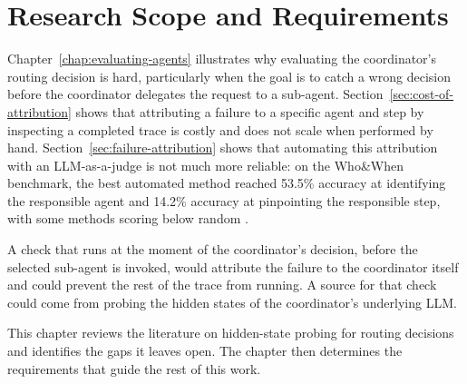 \chapter{Research Scope and Requirements}
\label{chap:motivation}

Chapter~\ref{chap:evaluating-agents} illustrates why evaluating the coordinator's routing decision is hard, particularly when the goal is to catch a wrong decision before the coordinator delegates the request to a sub-agent. Section~\ref{sec:cost-of-attribution} shows that attributing a failure to a specific agent and step by inspecting a completed trace is costly and does not scale when performed by hand. Section~\ref{sec:failure-attribution} shows that automating this attribution with an LLM-as-a-judge is not much more reliable: on the Who\&When benchmark, the best automated method reached 53.5\% accuracy at identifying the responsible agent and 14.2\% accuracy at pinpointing the responsible step, with some methods scoring below random \cite{zhangWhichAgentCauses2025}.

A check that runs at the moment of the coordinator's decision, before the selected sub-agent is invoked, would attribute the failure to the coordinator itself and could prevent the rest of the trace from running. A source for that check could come from probing the hidden states of the coordinator's underlying LLM.

This chapter reviews the literature on hidden-state probing for routing decisions and identifies the gaps it leaves open. The chapter then determines the requirements that guide the rest of this work.










